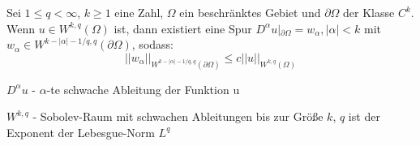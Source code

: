 \documentclass[11pt,a4paper]{article}
\begin{document}
Sei $1 \leq q < \infty$, $k \geq 1$ eine Zahl, $\Omega$ ein beschränktes Gebiet und $\partial \Omega$ der Klasse $C^k$. Wenn $u\in W^{k,q}(\Omega)$ ist, dann existiert eine Spur $D^{\alpha}u|_{\partial \Omega} = w_\alpha, |\alpha|<k$ mit $w_\alpha\in W^{k-|\alpha|-1/q,q}(\partial \Omega)$, sodass:
\begin{equation}
    ||w_\alpha||_{W^{k-|\alpha|-1/q,q}(\partial \Omega)} \leq c||u||_{W^{k,q}(\Omega)}
\end{equation}

$D^{\alpha}u$ - $\alpha$-te schwache Ableitung der Funktion u

$W^{k,q}$ - Sobolev-Raum mit schwachen Ableitungen bis zur Grö\ss e $k$, $q$ ist der Exponent der Lebesgue-Norm $L^q$
\end{document}
